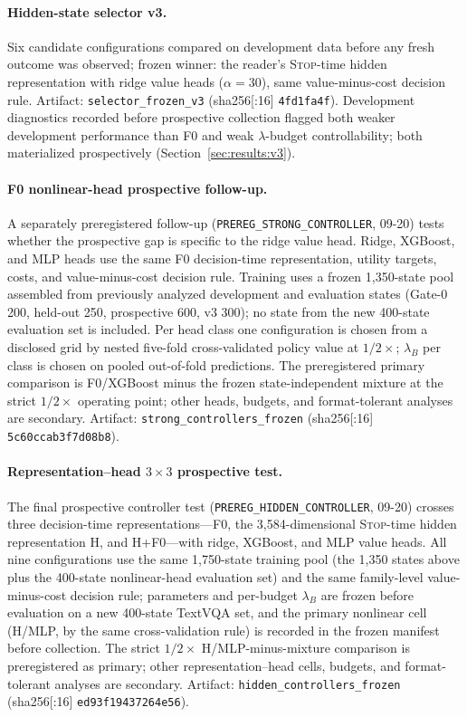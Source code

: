 \documentclass[10pt]{article}
\begin{document}
\paragraph{Hidden-state selector v3.}
Six candidate configurations compared on development data before any fresh
outcome was observed; frozen winner: the reader's \textsc{Stop}-time hidden
representation with ridge value heads ($\alpha=30$), same
value-minus-cost decision rule. Artifact: \texttt{selector\_frozen\_v3}
(sha256[:16] \texttt{4fd1fa4f}). Development diagnostics recorded before
prospective collection flagged both weaker development performance than F0
and weak $\lambda$-budget controllability; both materialized prospectively
(Section~\ref{sec:results:v3}).

\paragraph{F0 nonlinear-head prospective follow-up.}
A separately preregistered follow-up (\texttt{PREREG\_STRONG\_\allowbreak{}CONTROLLER},
09-20) tests whether the prospective gap is specific to the ridge value
head. Ridge, XGBoost, and MLP heads use the same F0 decision-time
representation, utility targets, costs, and value-minus-cost decision rule.
Training uses a frozen 1,350-state pool assembled from previously analyzed
development and evaluation states (Gate-0 200, held-out 250, prospective
600, v3 300); no state from the new 400-state evaluation set is included.
Per head class one configuration is chosen from a disclosed grid by nested
five-fold cross-validated policy value at $1/2\times$; $\lambda_B$ per
class is chosen on pooled out-of-fold predictions. The preregistered primary
comparison is F0/XGBoost minus the frozen state-independent mixture at the
strict $1/2\times$ operating point; other heads, budgets, and
format-tolerant analyses are secondary. Artifact:
\texttt{strong\_controllers\_frozen} (sha256[:16] \texttt{5c60ccab3f7d08b8}).

\paragraph{Representation--head $3\times3$ prospective test.}
The final prospective controller test (\texttt{PREREG\_HIDDEN\_\allowbreak{}CONTROLLER},
09-20) crosses three decision-time representations---F0, the
3,584-dimensional \textsc{Stop}-time hidden representation H, and
H+F0---with ridge, XGBoost, and MLP value heads. All nine configurations use
the same 1,750-state training pool (the 1,350 states above plus the
400-state nonlinear-head evaluation set) and the same family-level
value-minus-cost decision rule; parameters and per-budget $\lambda_B$ are
frozen before evaluation on a new 400-state TextVQA set, and the primary
nonlinear cell (H/MLP, by the same cross-validation rule) is recorded in the
frozen manifest before collection. The strict $1/2\times$ H/MLP-minus-mixture
comparison is preregistered as primary; other representation--head cells,
budgets, and format-tolerant analyses are secondary. Artifact:
\texttt{hidden\_controllers\_frozen} (sha256[:16] \texttt{ed93f19437264e56}).
\end{document}
